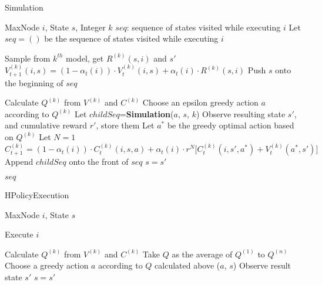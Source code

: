 \documentclass{article}
\begin{document}
\begin{algorithm}[t]
\caption{Simulation} \label{fig:Simulation}
\begin{algorithmic}[1]
\REQUIRE MaxNode $i$, State $s$, Integer $k$
\ENSURE $seq$: sequence of states visited while executing $i$
\STATE Let $seq=()$ be the sequence of states visited while executing $i$

\STATE Sample from $k^{th}$ model, get $R^{(k)}(s, i)$ and $s'$
\STATE $V_{t+1}^{(k)}(i,s) = (1-\alpha_t(i))\cdot V_t^{(k)}(i,s)+\alpha_t(i)\cdot R^{(k)}(s, i)$
\STATE Push $s$ onto the beginning of $seq$

\ELSE
{}
\STATE Calculate $Q^{(k)}$ from $V^{(k)}$ and $C^{(k)}$
\STATE Choose an epsilon greedy action $a$ according to $Q^{(k)}$
\STATE Let $childSeq$={\bf Simulation}($a$, $s$, $k$)
\STATE Observe resulting state $s'$, and cumulative reward $r'$, store them
\STATE Let $a^*$ be the greedy optimal action based on $Q^{(k)}$
\STATE Let $N=1$
\STATE $C_{t+1}^{(k)}=(1-\alpha_t(i))\cdot C_t^{(k)}(i,s,a) + \alpha_t(i)\cdot r^N\bigl[C_t^{(k)}(i,s',a^*)+V_t^{(k)}(a^*,s') \bigr]$
\ENDFOR
\STATE Append $childSeq$ onto the front of $seq$
\STATE $s=s'$
\ENDWHILE

\RETURN $seq$
\ENDIF

\end{algorithmic}
\end{algorithm} 


\begin{algorithm}[t]
\caption{HPolicyExecution} \label{fig:ExePolicy}
\begin{algorithmic}[1]
\REQUIRE MaxNode $i$, State $s$

\STATE Execute $i$

\ELSE
{}
\STATE Calculate $Q^{(k)}$ from $V^{(k)}$ and $C^{(k)}$
\ENDFOR
\STATE Take $Q$ as the average of $Q^{(1)}$ to $Q^{(n)}$
\STATE Choose a greedy action $a$ according to $Q$ calculated above
($a$, $s$)
\STATE Observe result state $s'$
\STATE $s=s'$
\ENDWHILE
\ENDIF

\end{algorithmic}
\end{algorithm} 
\end{document}
